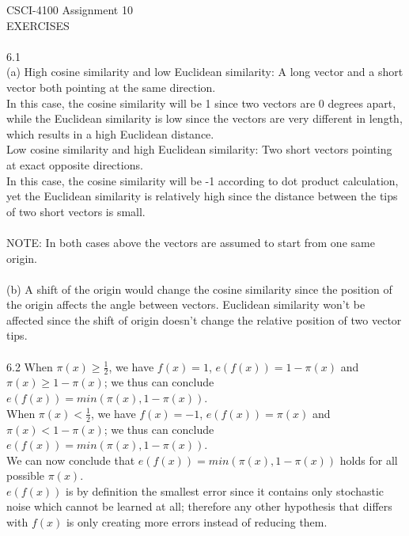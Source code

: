 \documentclass[12pt]{article}
\begin{document}
CSCI-4100 Assignment 10\\
EXERCISES\\\\
6.1\\
(a) High cosine similarity and low Euclidean similarity: A long vector and a short vector both pointing at the same direction. \\

	In this case, the cosine similarity will be 1 since two vectors are 0 degrees apart, while the Euclidean similarity is low since the vectors are very different in length, which results in a high Euclidean distance. \\
	
	Low cosine similarity and high Euclidean similarity: Two short vectors pointing at exact opposite directions.\\
	
	In this case, the cosine similarity will be -1 according to dot product calculation, yet the Euclidean similarity is relatively high since the distance between the tips of two short vectors is small. \\\\
	
	NOTE: In both cases above the vectors are assumed to start from one same origin.\\\\
(b) A shift of the origin would change the cosine similarity since the position of the origin affects the angle between vectors. Euclidean similarity won't be affected since the shift of origin doesn't change the relative position of two vector tips. \\\\
6.2 When $\pi(x)\geq \frac{1}{2}$, we have $f(x)=1$, $e(f(x))=1-\pi(x)$ and $\pi(x)\geq 1-\pi(x)$; we thus can conclude $e(f(x))=min(\pi(x),1-\pi(x))$.\\
 	When $\pi(x)< \frac{1}{2}$, we have $f(x)=-1$, $e(f(x))=\pi(x)$ and $\pi(x)< 1-\pi(x)$; we thus can conclude $e(f(x))=min(\pi(x),1-\pi(x))$.\\
 	We can now conclude that $e(f(x))=min(\pi(x),1-\pi(x))$ holds for all possible $\pi(x)$.\\
 	$e(f(x))$ is by definition the smallest error since it contains only stochastic noise which cannot be learned at all; therefore any other hypothesis that differs with $f(x)$ is only creating more errors instead of reducing them.\\\\ 
\end{document}

